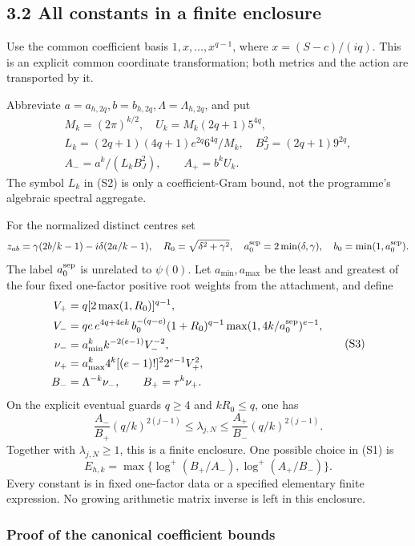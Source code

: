 \subsection{3.2 All constants in a finite enclosure}\label{all-constants-in-a-finite-enclosure}

Use the common coefficient basis \(1,x,\ldots,x^{q-1}\), where \(x=(S-c)/(iq)\). This is an explicit common coordinate transformation; both metrics and the action are transported by it.

Abbreviate \(a=a_{h,2q}, b=b_{h,2q}, \Lambda=\Lambda_{h,2q}\), and put \[
\begin{gathered}
M_k=(2\pi)^{k/2},\quad
U_k=M_k(2q+1)5^{4q},\\
L_k=(2q+1)(4q+1)e^{2q}6^{4q}/M_k,\quad
B_J^2=(2q+1)9^{2q},\\
A_-=a^k/(L_kB_J^2),\qquad A_+=b^kU_k. \tag{S2}
\end{gathered}
\] The symbol \(L_k\) in (S2) is only a coefficient-Gram bound, not the programme's algebraic spectral aggregate.

For the normalized distinct centres set \[
z_{ab}=\gamma(2b/k-1)-i\delta(2a/k-1),\quad
R_0=\sqrt{\delta^2+\gamma^2},\quad
a_0^{\rm sep}=2\min(\delta,\gamma),\quad b_0=\min(1,a_0^{\rm sep}).
\] The label \(a_0^{\rm sep}\) is unrelated to \(\psi(0)\). Let \(a_{\min},a_{\max}\) be the least and greatest of the four fixed one-factor positive root weights from the attachment, and define \[
\begin{aligned}
V_+&=q[2\max(1,R_0)]^{q-1},\\
V_-&=qe\,e^{4q+4ek}\,
 b_0^{-(q-e)}(1+R_0)^{q-1}
 \max(1,4k/a_0^{\rm sep})^{e-1},\\
\nu_-&=a_{\min}^k k^{-2(e-1)}V_-^{-2},\\
\nu_+&=a_{\max}^k4^k[(e-1)!]^2 2^{e-1} V_+^2,\\
B_-&=\Lambda^{-k}\nu_-,\qquad B_+=\tau^k\nu_+.
\end{aligned} \tag{S3}
\] On the explicit eventual guards \(q\ge4\) and \(kR_0\le q\), one has \[
 \boxed{
 \frac{A_-}{B_+}(q/k)^{2(j-1)}
 \le\lambda_{j,N}
 \le\frac{A_+}{B_-}(q/k)^{2(j-1)}.
 } \tag{S4}
\] Together with \(\lambda_{j,N}\ge1\), this is a finite enclosure. One possible choice in (S1) is \[
 E_{h,k}=\max\{\log^+(B_+/A_-),\log^+(A_+/B_-)\}. \tag{S5}
\] Every constant is in fixed one-factor data or a specified elementary finite expression. No growing arithmetic matrix inverse is left in this enclosure.

\subsubsection{Proof of the canonical coefficient bounds}\label{proof-of-the-canonical-coefficient-bounds}

